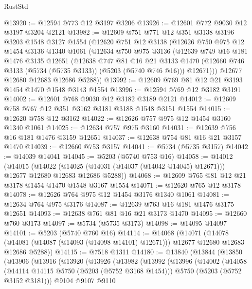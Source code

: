 \begin{lexlean}{RustStd}
\begin{coremodule}
@13920 := @12594 @773 @12 @3197 @3206
@13926 := @12601 @772 @9030 @12 @3197 @3204 @2121
@13982 := @12609
    @751
    @771
    @12
    @351
    @3138
    @3196
    @3203
    @1548
    @3127
    @1554
    (@12620
      @751
      @12
      @3138
      (@12626
        @750
        @975
        @12
        @1454
        @3136
        @1340
        @1061
        (@12634
          @750
          @975
          @3136
          (@12639
            @749
            @16
            @181
            @1476
            @3135
            @12651
            (@12638
              @747
              @81
              @16
              @21
              @3133
              @1470
              (@12660 @746 @3133 (@5734 (@5735 @3133)) (@5203 (@5740 @746 @16)))
              @12671)))
        @12677
        @12680
        @12683
        @12686
        @5288))
@13992 := @12609 @769 @81 @12 @21 @3193 @1454 @1470 @1548 @3143 @1554
@13996 := @12594 @769 @12 @3182 @3191
@14002 := @12601 @768 @9030 @12 @3182 @3189 @2121
@14012 := @12609 @758 @767 @12 @351 @3162 @3181 @3188 @1548 @3151 @1554
@14015 := @12620 @758 @12 @3162
@14022 := @12626 @757 @975 @12 @1454 @3160 @1340 @1061
@14025 := @12634 @757 @975 @3160
@14031 := @12639 @756 @16 @181 @1476 @3159 @12651
@14037 := @12638 @754 @81 @16 @21 @3157 @1470
@14039 := @12660 @753 @3157
@14041 := @5734 (@5735 @3157)
@14042 := @14039 @14041
@14045 := @5203 (@5740 @753 @16)
@14058 := @14012
    (@14015
      (@14022 (@14025 (@14031 (@14037 (@14042 @14045) @12671))) @12677 @12680 @12683 @12686 @5288))
@14068 := @12609 @765 @81 @12 @21 @3178 @1454 @1470 @1548 @3167 @1554
@14071 := @12620 @765 @12 @3178
@14078 := @12626 @764 @975 @12 @1454 @3176 @1340 @1061
@14081 := @12634 @764 @975 @3176
@14087 := @12639 @763 @16 @181 @1476 @3175 @12651
@14093 := @12638 @761 @81 @16 @21 @3173 @1470
@14095 := @12660 @760 @3173
@14097 := @5734 (@5735 @3173)
@14098 := @14095 @14097
@14101 := @5203 (@5740 @760 @16)
@14114 := @14068
    (@14071
      (@14078 (@14081 (@14087 (@14093 (@14098 @14101) @12671))) @12677 @12680 @12683 @12686 @5288))
@14115 := @7518 @1311
@14180 := @13840
    (@13844
      (@13850
        (@13906
          (@13916
            (@13920
              (@13926
                (@13982
                  (@13992
                    (@13996
                      (@14002
                        (@14058
                          (@14114 @14115 @5750 (@5203 (@5752 @3168 @1454)))
                          @5750
                          (@5203 (@5752 @3152 @3181)))
                        @9104
                        @9107
                        @9110

\end{coremodule}
\end{lexlean}
